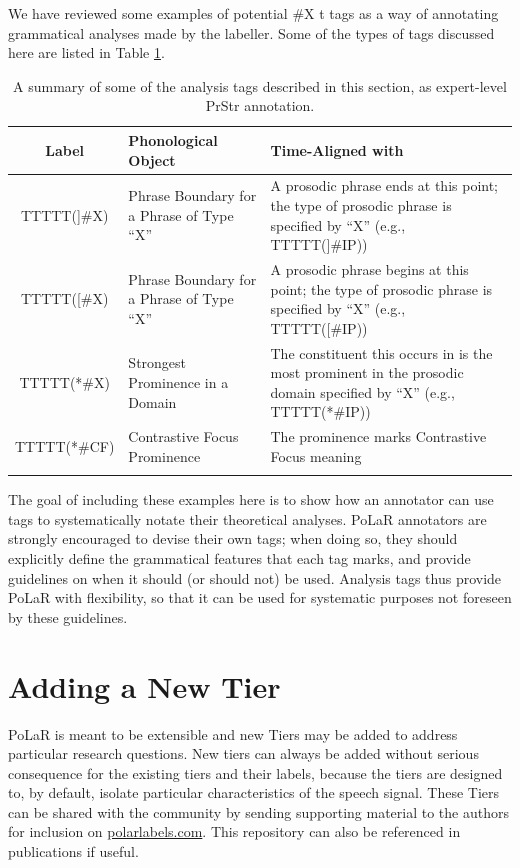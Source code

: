 \documentclass[11pt, twoside]{memoir}
\begin{document}
We have reviewed some examples of potential \#X t tags as a way of annotating grammatical analyses made by the labeller. Some of the types of tags discussed here are listed in Table \ref{tab:beyond polar tags}.

\begin{longtable}{cp{.3\linewidth}p{.5\linewidth}}
\toprule \textbf{Label} & \textbf{Phonological Object} & \textbf{Time-Aligned with} \tabularnewline
\midrule
\endhead
TTTTT(]\#X) & Phrase Boundary for a Phrase of Type “X” & A prosodic phrase ends at this point; the type of prosodic phrase is specified by “X” (e.g., TTTTT(]\#IP)) \tabularnewline\hdashline
TTTTT([\#X) & Phrase Boundary for a Phrase of Type “X” & A prosodic phrase begins at this point; the type of prosodic phrase is specified by “X” (e.g., TTTTT([\#IP)) \tabularnewline\hdashline
TTTTT(*\#X) & Strongest Prominence in a Domain & The constituent this occurs in is the most prominent in the prosodic domain specified by “X” (e.g., TTTTT(*\#IP)) \tabularnewline\hdashline
TTTTT(*\#CF) & Contrastive Focus Prominence & The prominence marks Contrastive Focus meaning \tabularnewline
 \bottomrule 
\caption{A summary of some of the analysis tags described in this section, as expert-level PrStr annotation.}
\label{tab:beyond polar tags}
\end{longtable}

The goal of including these examples here is to show how an annotator can use tags to systematically notate their theoretical analyses. PoLaR annotators are strongly encouraged to devise their own tags; when doing so, they should explicitly define the grammatical features that each tag marks, and provide guidelines on when it should (or should not) be used. Analysis tags thus provide PoLaR with flexibility, so that it can be used for systematic purposes not foreseen by these guidelines.

\section{Adding a New Tier}\label{sec:adding-a-new-tier}

PoLaR is meant to be extensible and new Tiers may be added to address particular research questions. New tiers can always be added without serious consequence for the existing tiers and their labels, because the tiers are designed to, by default, isolate particular characteristics of the speech signal. These Tiers can be shared with the community by sending  supporting material to the authors for inclusion on \href{https://www.polarlabels.com}{polarlabels.com}. This repository can also be referenced in publications if useful. 
 
\end{document}
